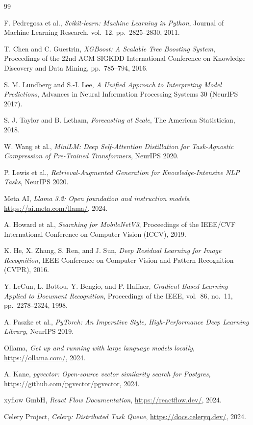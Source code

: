 \documentclass[12pt, a4paper]{report}
\begin{document}
\begin{thebibliography}{99}

F. Pedregosa et al.,
\textit{Scikit-learn: Machine Learning in Python},
Journal of Machine Learning Research, vol.~12, pp.~2825--2830, 2011.

T. Chen and C. Guestrin,
\textit{XGBoost: A Scalable Tree Boosting System},
Proceedings of the 22nd ACM SIGKDD International Conference on
Knowledge Discovery and Data Mining, pp.~785--794, 2016.

S. M. Lundberg and S.-I. Lee,
\textit{A Unified Approach to Interpreting Model Predictions},
Advances in Neural Information Processing Systems 30 (NeurIPS 2017).

S. J. Taylor and B. Letham,
\textit{Forecasting at Scale}, The American Statistician, 2018.

W. Wang et al.,
\textit{MiniLM: Deep Self-Attention Distillation for Task-Agnostic
Compression of Pre-Trained Transformers}, NeurIPS 2020.

P. Lewis et al.,
\textit{Retrieval-Augmented Generation for Knowledge-Intensive NLP
Tasks}, NeurIPS 2020.

Meta AI,
\textit{Llama 3.2: Open foundation and instruction models},
\url{https://ai.meta.com/llama/}, 2024.

A. Howard et al.,
\textit{Searching for MobileNetV3},
Proceedings of the IEEE/CVF International Conference on Computer
Vision (ICCV), 2019.

K. He, X. Zhang, S. Ren, and J. Sun,
\textit{Deep Residual Learning for Image Recognition},
IEEE Conference on Computer Vision and Pattern Recognition (CVPR),
2016.

Y. LeCun, L. Bottou, Y. Bengio, and P. Haffner,
\textit{Gradient-Based Learning Applied to Document Recognition},
Proceedings of the IEEE, vol.~86, no.~11, pp.~2278--2324, 1998.

A. Paszke et al.,
\textit{PyTorch: An Imperative Style, High-Performance Deep
Learning Library}, NeurIPS 2019.

Ollama,
\textit{Get up and running with large language models locally},
\url{https://ollama.com/}, 2024.

A. Kane,
\textit{pgvector: Open-source vector similarity search for
Postgres},
\url{https://github.com/pgvector/pgvector}, 2024.

xyflow GmbH,
\textit{React Flow Documentation},
\url{https://reactflow.dev/}, 2024.

Celery Project,
\textit{Celery: Distributed Task Queue},
\url{https://docs.celeryq.dev/}, 2024.

\end{thebibliography}
\end{document}
